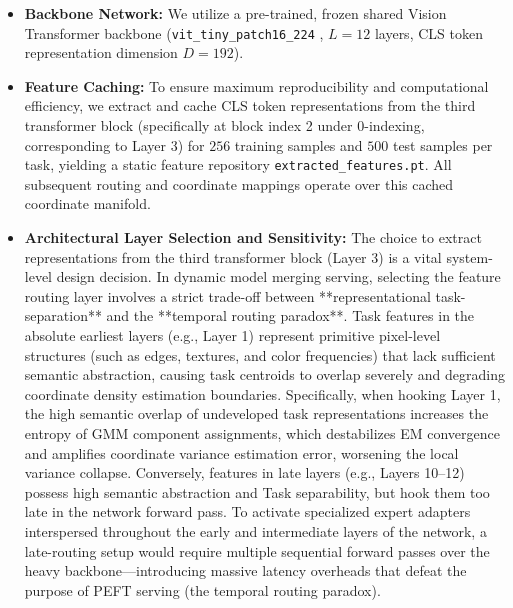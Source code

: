 \begin{itemize}
    \item {\bf Backbone Network:} We utilize a pre-trained, frozen shared Vision Transformer backbone (\texttt{vit\_tiny\_patch16\_224} \cite{dosovitskiy2020image}, $L=12$ layers, CLS token representation dimension $D=192$).
    \item {\bf Feature Caching:} To ensure maximum reproducibility and computational efficiency, we extract and cache CLS token representations from the third transformer block (specifically at block index 2 under 0-indexing, corresponding to Layer 3) for $256$ training samples and $500$ test samples per task, yielding a static feature repository \texttt{extracted\_features.pt}. All subsequent routing and coordinate mappings operate over this cached coordinate manifold.
    \item {\bf Architectural Layer Selection and Sensitivity:} The choice to extract representations from the third transformer block (Layer 3) is a vital system-level design decision. In dynamic model merging serving, selecting the feature routing layer involves a strict trade-off between **representational task-separation** and the **temporal routing paradox**. Task features in the absolute earliest layers (e.g., Layer 1) represent primitive pixel-level structures (such as edges, textures, and color frequencies) that lack sufficient semantic abstraction, causing task centroids to overlap severely and degrading coordinate density estimation boundaries. Specifically, when hooking Layer 1, the high semantic overlap of undeveloped task representations increases the entropy of GMM component assignments, which destabilizes EM convergence and amplifies coordinate variance estimation error, worsening the local variance collapse. Conversely, features in late layers (e.g., Layers 10--12) possess high semantic abstraction and Task separability, but hook them too late in the network forward pass. To activate specialized expert adapters interspersed throughout the early and intermediate layers of the network, a late-routing setup would require multiple sequential forward passes over the heavy backbone—introducing massive latency overheads that defeat the purpose of PEFT serving (the temporal routing paradox). 


\end{itemize}

